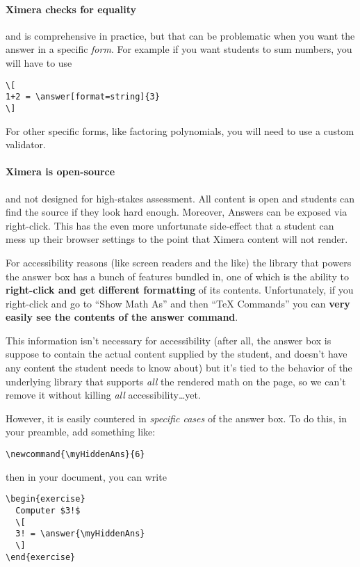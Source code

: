 \documentclass{ximera}
\begin{document}
\paragraph{Ximera checks for equality} and is comprehensive in
practice, but that can be problematic when you want the answer in a specific
\textit{form}. For example if you want students to sum numbers, you will have
to use
\begin{verbatim}
\[
1+2 = \answer[format=string]{3}
\]
\end{verbatim}
For other specific forms, like factoring polynomials, you will need to use a
custom validator.

\paragraph{Ximera is open-source} and not designed for high-stakes assessment.
All content is
open and students can find the source if they look hard enough. Moreover,
Answers can be exposed via right-click. This has the even more unfortunate
side-effect that a student can mess up their browser settings to the point that
Ximera content will not render.

For accessibility reasons (like screen readers and the like) the library
that powers the answer box has a bunch of features bundled in, one of which is
the ability to \textbf{right-click and get different formatting} of its
contents.
Unfortunately, if you right-click and go to ``Show Math As'' and then ``TeX
Commands'' you can \textbf{very easily see the contents of the answer command}.

This information isn't necessary for accessibility
(after all, the answer box is suppose to contain the actual content supplied by
the student, and doesn't have any content the student needs to know about) but
it's tied to the behavior of the underlying library that supports \textit{all}
the rendered math on the page, so we can't remove it without killing
\textit{all} accessibility\dots yet.

However, it is easily countered in \textit{specific cases} of the answer box.
To do this, in your preamble, add something like:
\begin{verbatim}
\newcommand{\myHiddenAns}{6}
\end{verbatim}
then in your document, you can write
\begin{verbatim}
\begin{exercise}
  Computer $3!$
  \[
  3! = \answer{\myHiddenAns}
  \]  
\end{exercise}
\end{verbatim}
\end{document}
